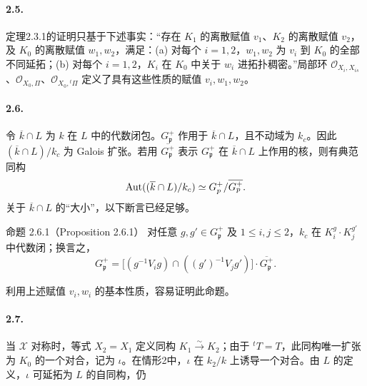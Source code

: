 \paragraph*{2.5.}
定理2.3.1的证明只基于下述事实：“存在 $K_1$ 的离散赋值 $v_1$、$K_2$ 的离散赋值 $v_2$，及 $K_0$ 的离散赋值 $w_1,w_2$，满足：(a) 对每个 $i=1,2$，$w_1,w_2$ 为 $v_i$ 到 $K_0$ 的全部不同延拓；(b) 对每个 $i=1,2$，$K_i$ 在 $K_0$ 中关于 $w_i$ 进拓扑稠密。”局部环 $\mathcal O_{X_i,X_{is}}$、$\mathcal O_{X_0,\Pi}$、$\mathcal O_{X_0,{}^t\Pi}$ 定义了具有这些性质的赋值 $v_i,w_1,w_2$。

\paragraph*{2.6.}
令 $\overline k\cap L$ 为 $k$ 在 $L$ 中的代数闭包。$G_{\mathfrak p}^+$ 作用于 $\overline k\cap L$，且不动域为 $k_c$。因此 $(\overline k\cap L)/k_c$ 为 Galois 扩张。若用 $\overline{G_{\mathfrak p}^+}$ 表示 $G_{\mathfrak p}^+$ 在 $\overline k\cap L$ 上作用的核，则有典范同构
\[
 \operatorname{Aut}((\overline k\cap L)/k_c)
 \simeq G_{p}^+/\overline{G_{p}^+}.
\]
关于 $\overline k\cap L$ 的“大小”，以下断言已经足够。

\begin{originaltheorem}{命题 2.6.1（Proposition 2.6.1）}
对任意 $g,g'\in G_{\mathfrak p}^+$ 及 $1\leq i,j\leq2$，$k_c$ 在 $K_i^g\cdot K_j^{g'}$ 中代数闭；换言之，
\[
 G_{\mathfrak p}^+
 =\bigl[(g^{-1}V_ig)\cap((g')^{-1}V_jg')\bigr]
 \cdot\overline{G_{\mathfrak p}^+}.
\]
\end{originaltheorem}
利用上述赋值 $v_i,w_i$ 的基本性质，容易证明此命题。

\paragraph*{2.7.}
当 $\mathcal X$ 对称时，等式 $X_2=X_1$ 定义同构 $K_1\xrightarrow{\sim}K_2$；由于 ${}^tT=T$，此同构唯一扩张为 $K_0$ 的一个对合，记为 $\iota$。在情形2中，$\iota$ 在 $k_2/k$ 上诱导一个对合。由 $L$ 的定义，$\iota$ 可延拓为 $L$ 的自同构，仍
